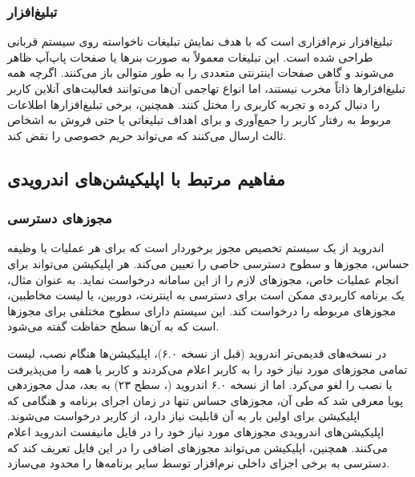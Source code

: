 \subsubsection{تبلیغ‌افزار}
تبلیغ‌افزار نرم‌افزاری است که با هدف نمایش تبلیغات ناخواسته روی سیستم قربانی طراحی شده است. این تبلیغات معمولاً به صورت بنرها یا صفحات پاپ‌آپ ظاهر می‌شوند و گاهی صفحات اینترنتی متعددی را به طور متوالی باز می‌کنند. اگرچه همه تبلیغ‌افزارها ذاتاً مخرب نیستند، اما انواع تهاجمی آن‌ها می‌توانند فعالیت‌های آنلاین کاربر را دنبال کرده و تجربه کاربری را مختل کنند. همچنین، برخی تبلیغ‌افزارها اطلاعات مربوط به رفتار کاربر را جمع‌آوری و برای اهداف تبلیغاتی یا حتی فروش به اشخاص ثالث ارسال می‌کنند که می‌تواند حریم خصوصی را نقض کند.

\subsection{مفاهیم مرتبط با اپلیکیشن‌های اندرویدی}

\subsubsection{مجوزهای دسترسی}
اندروید از یک سیستم تخصیص مجوز برخوردار است که برای هر عملیات یا وظیفه  حساس، مجوزها و سطوح دسترسی خاصی را تعیین می‌کند. هر اپلیکیشن می‌تواند برای انجام عملیات خاص، مجوزهای لازم را از این سامانه درخواست نماید. به عنوان مثال، یک برنامه کاربردی ممکن است برای دسترسی به اینترنت، دوربین، یا لیست مخاطبین، مجوزهای مربوطه را درخواست کند. این سیستم دارای سطوح مختلفی برای مجوزها است که به آن‌ها سطح حفاظت  گفته می‌شود.

در نسخه‌های قدیمی‌تر اندروید (قبل از نسخه ۶.۰)، اپلیکیشن‌ها هنگام نصب، لیست تمامی مجوزهای مورد نیاز خود را به کاربر اعلام می‌کردند و کاربر یا همه را می‌پذیرفت یا نصب را لغو می‌کرد. اما از نسخه ۶.۰ اندروید (،  سطح ۲۳) به بعد، مدل مجوزدهی پویا  معرفی شد که طی آن، مجوزهای حساس تنها در زمان اجرای برنامه و هنگامی که اپلیکیشن برای اولین بار به آن قابلیت نیاز دارد، از کاربر درخواست می‌شوند. اپلیکیشن‌های اندرویدی مجوزهای مورد نیاز خود را در فایل مانیفست اندروید  اعلام می‌کنند. همچنین، اپلیکیشن می‌تواند مجوزهای اضافی را در این فایل تعریف کند که دسترسی به برخی اجزای داخلی نرم‌افزار توسط سایر برنامه‌ها را محدود می‌سازد.

